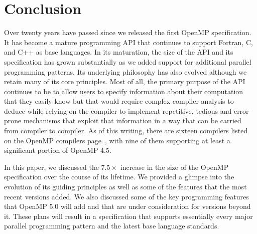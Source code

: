 \section{Conclusion}
\label{sec:conclusion}

Over twenty years have passed since we released the first OpenMP specification.
It has become a mature programming API that continues to support Fortran, C, and
C++ as base languages. In its maturation, the size of the API and its
specification has grown substantially as we added support for additional
parallel programming patterns. Its underlying philosophy has also evolved
although we retain many of its core principles. Most of all, the primary purpose
of the API continues to be to allow users to specify information about their
computation that they easily know but that would require complex compiler
analysis to deduce while relying on the compiler to implement repetitive,
tedious and error-prone mechanisms that exploit that information in a way that
can be carried from compiler to compiler.  As of this writing, there are sixteen
compilers listed on the OpenMP compilers page~\cite{openmp-compilers}, with nine
of them supporting at least a significant portion of OpenMP 4.5.

In this paper, we discussed the $7.5\times$ increase in the size of the 
OpenMP specification over the course of its lifetime. We provided 
a glimpse into the evolution of its guiding principles as well as
some of the features that the most recent versions added. We also
discussed some of the key programming features that OpenMP 5.0 will
add and that are under consideration for versions beyond it. These
plans will result in a specification that supports essentially every 
major parallel programming pattern and the latest base language standards.


